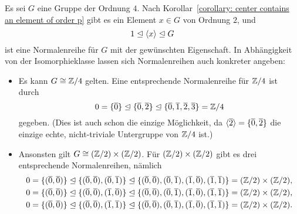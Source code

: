 Es sei $G$ eine Gruppe der Ordnung $4$.
Nach Korollar~\ref{corollary: center contains an element of order p} gibt es ein Element $x \in G$ von Ordnung $2$, und
\[
              1
  \trianglelefteq  \langle x\rangle
  \trianglelefteq  G
\]
ist eine Normalenreihe für $G$ mit der gewünschten Eigenschaft.
In Abhängigkeit von der Isomorphieklasse lassen sich Normalenreihen auch konkreter angeben:
\begin{itemize}
  \item
    Es kann $G \cong \mathbb{Z}/4$ gelten.
    Eine entsprechende Normalenreihe für $\mathbb{Z}/4$ ist durch
    \[
                  0
      =           \{ \overline{0} \}
      \trianglelefteq  \{ \overline{0}, \overline{2} \}
      \trianglelefteq  \{ \overline{0}, \overline{1}, \overline{2}, \overline{3} \}
      =           \mathbb{Z}/4
    \]
    gegeben.
    (Dies ist auch schon die einzige Möglichkeit, da $\langle \overline{2} \rangle = \{ \overline{0}, \overline{2} \}$ die einzige echte, nicht-triviale Untergruppe von $\mathbb{Z}/4$ ist.)
  \item
    Ansonsten gilt $G \cong (\mathbb{Z}/2) \times (\mathbb{Z}/2)$.
    Für $(\mathbb{Z}/2) \times (\mathbb{Z}/2)$ gibt es drei entsprechende Normalenreihen, nämlich
    \begin{gather*}
                  0
      =           \{ (\overline{0},\overline{0}) \}
      \trianglelefteq  \{ (\overline{0},\overline{0}), (\overline{0},\overline{1}) \}
      \trianglelefteq  \{ (\overline{0},\overline{0}), (\overline{0},\overline{1}), (\overline{1},\overline{0}), (\overline{1},\overline{1}) \}
      =           (\mathbb{Z}/2) \times (\mathbb{Z}/2),
      \\
                  0
      =           \{ (\overline{0},\overline{0}) \}
      \trianglelefteq  \{ (\overline{0},\overline{0}), (\overline{1},\overline{0}) \}
      \trianglelefteq  \{ (\overline{0},\overline{0}), (\overline{0},\overline{1}), (\overline{1},\overline{0}), (\overline{1},\overline{1}) \}
      =           (\mathbb{Z}/2) \times (\mathbb{Z}/2),
      \\
                  0
      =           \{ (\overline{0},\overline{0}) \}
      \trianglelefteq  \{ (\overline{0},\overline{0}), (\overline{1},\overline{1}) \}
      \trianglelefteq  \{ (\overline{0},\overline{0}), (\overline{0},\overline{1}), (\overline{1},\overline{0}), (\overline{1},\overline{1}) \}
      =           (\mathbb{Z}/2) \times (\mathbb{Z}/2).
    \end{gather*}
\end{itemize}





\subsection{}

